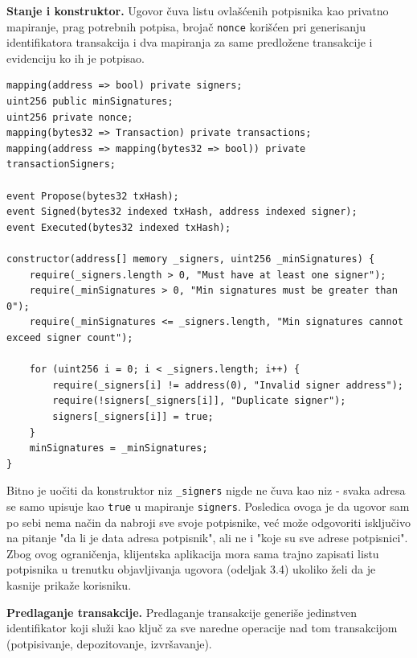 \textbf{Stanje i konstruktor.} Ugovor \v cuva listu ovla\v s\' cenih potpisnika kao privatno mapiranje, prag potrebnih potpisa, broja\v c \texttt{nonce} kori\v s\' cen pri generisanju identifikatora transakcija i dva mapiranja za same predlo\v zene transakcije i evidenciju ko ih je potpisao.

\begin{lstlisting}[caption={Stanje i konstruktor ugovora \texttt{MultiSig}}, label={lst:multisig-state}]
mapping(address => bool) private signers;
uint256 public minSignatures;
uint256 private nonce;
mapping(bytes32 => Transaction) private transactions;
mapping(address => mapping(bytes32 => bool)) private transactionSigners;

event Propose(bytes32 txHash);
event Signed(bytes32 indexed txHash, address indexed signer);
event Executed(bytes32 indexed txHash);

constructor(address[] memory _signers, uint256 _minSignatures) {
    require(_signers.length > 0, "Must have at least one signer");
    require(_minSignatures > 0, "Min signatures must be greater than 0");
    require(_minSignatures <= _signers.length, "Min signatures cannot exceed signer count");

    for (uint256 i = 0; i < _signers.length; i++) {
        require(_signers[i] != address(0), "Invalid signer address");
        require(!signers[_signers[i]], "Duplicate signer");
        signers[_signers[i]] = true;
    }
    minSignatures = _minSignatures;
}
\end{lstlisting}

Bitno je uo\v citi da konstruktor niz \texttt{\_signers} nigde ne \v cuva kao niz - svaka adresa se samo upisuje kao \texttt{true} u mapiranje \texttt{signers}. Posledica ovoga je da ugovor sam po sebi nema na\v cin da nabroji sve svoje potpisnike, ve\' c mo\v ze odgovoriti isklju\v civo na pitanje "da li je data adresa potpisnik", ali ne i "koje su sve adrese potpisnici". Zbog ovog ograni\v cenja, klijentska aplikacija mora sama trajno zapisati listu potpisnika u trenutku objavljivanja ugovora (odeljak 3.4) ukoliko \v zeli da je kasnije prika\v ze korisniku.

\textbf{Predlaganje transakcije.} Predlaganje transakcije generi\v se jedinstven identifikator koji slu\v zi kao klju\v c za sve naredne operacije nad tom transakcijom (potpisivanje, depozitovanje, izvr\v savanje).

